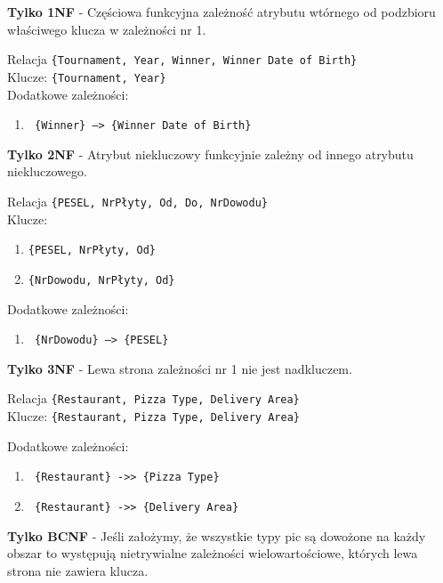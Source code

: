 \begin{tcolorbox}
    \textbf{Tylko 1NF} - Częściowa funkcyjna zależność atrybutu wtórnego od
    podzbioru właściwego klucza w zależności nr 1.
\end{tcolorbox}

\pagebreak

Relacja \texttt{\{Tournament, Year, Winner, Winner Date of Birth\}}\\
Klucze: \texttt{\{Tournament, Year\}}\\
Dodatkowe zależności:
\begin{enumerate}
    \item \texttt{ \{Winner\} --> \{Winner Date of Birth\}}
\end{enumerate}

\begin{tcolorbox}
    \textbf{Tylko 2NF} - Atrybut niekluczowy funkcyjnie zależny od innego
    atrybutu niekluczowego.
\end{tcolorbox}

\vskip 0.5cm
Relacja \texttt{\{PESEL, NrPłyty, Od, Do, NrDowodu\}}\\
Klucze:
\begin{enumerate}
    \item \texttt{\{PESEL, NrPłyty, Od\}}
    \item \texttt{\{NrDowodu, NrPłyty, Od\}}
\end{enumerate}

Dodatkowe zależności:
\begin{enumerate}
    \item \texttt{ \{NrDowodu\} --> \{PESEL\}}
\end{enumerate}

\begin{tcolorbox}
    \textbf{Tylko 3NF} - Lewa strona zależności nr 1 nie jest nadkluczem.
\end{tcolorbox}

\vskip 0.5cm
Relacja \texttt{\{Restaurant, Pizza Type, Delivery Area\}}\\
Klucze: \texttt{\{Restaurant, Pizza Type, Delivery Area\}}

Dodatkowe zależności:
\begin{enumerate}
    \item \texttt{ \{Restaurant\} ->> \{Pizza Type\}}
    \item \texttt{ \{Restaurant\} ->> \{Delivery Area\}}
\end{enumerate}

\begin{tcolorbox}
    \textbf{Tylko BCNF} - Jeśli założymy, że wszystkie typy pic są dowożone na
    każdy obszar to występują nietrywialne zależności wielowartościowe, których
    lewa strona nie zawiera klucza.
\end{tcolorbox}

